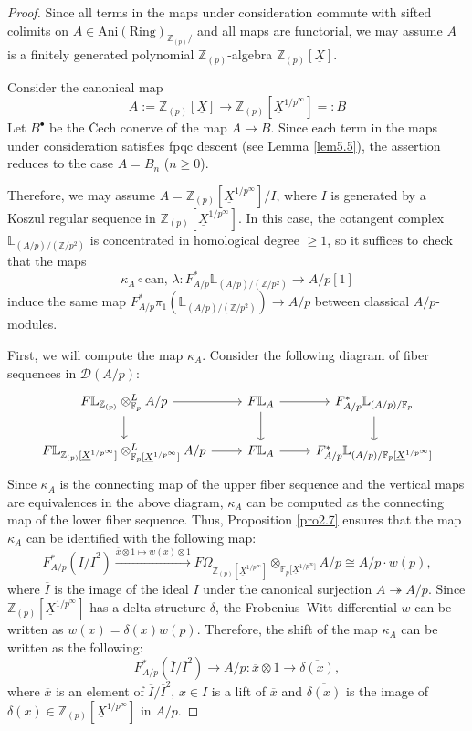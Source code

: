 \documentclass[11pt, a4paper]{amsart}
\theoremstyle{plain}
\theoremstyle{definition}
\begin{document}
\begin{proof}
    Since all terms in the maps under consideration commute with sifted colimits on $A\in \operatorname{Ani(Ring)}_{\mathbb Z_{(p)}/}$ and all maps are functorial, we may assume $A$ is a finitely generated polynomial $\mathbb Z_{(p)}$-algebra $\mathbb Z_{(p)}[\underline{X}]$.

    Consider the canonical map \[A:=\mathbb Z_{(p)}[\underline{X}]\to \mathbb Z_{(p)}[\underline{X}^{1/p^{\infty}}]=:B\]
    Let $B^{\bullet}$ be the \v{C}ech conerve of the map $A\to B$. Since each term in the maps under consideration satisfies fpqc descent (see Lemma \ref{lem5.5}), the assertion reduces to the case $A=B_n$ ($n\ge0$). 

    Therefore, we may assume $A=\mathbb Z_{(p)}[\underline{X}^{1/p^{\infty}}]/I$, where $I$ is generated by a Koszul regular sequence in $\mathbb Z_{(p)}[\underline{X}^{1/p^{\infty}}]$. In this case, the cotangent complex $\mathbb L_{(A/p)/(\mathbb Z/p^2)}$ is concentrated in homological degree $\ge 1$, so it suffices to check that the maps \[\kappa_A\circ \mathrm{can},\,\lambda:F_{A/p}^*\mathbb L_{(A/p)/(\mathbb Z/p^2)}\to A/p[1]\] induce the same map $F_{A/p}^*\pi_1(\mathbb L_{(A/p)/(\mathbb Z/p^2)})\to A/p$ between classical $A/p$-modules.

    First, we will compute the map $\kappa_A$. Consider the following diagram of fiber sequences in $\mathcal D(A/p)$:\[
\begin{tikzcd}
F\mathbb L_{\mathbb Z_{(p)}}\otimes^L_{\mathbb F_p}A/p \arrow[r, ] \arrow[d, ] 
    & F\mathbb L_A \arrow[r, ] \arrow[d, ] 
    & F_{A/p}^*\mathbb L_{(A/p)/\mathbb F_p}  \arrow[d, ]\\
F\mathbb L_{\mathbb Z_{(p)}[\underline{X}^{1/p^{\infty}}]}\otimes^L_{\mathbb F_p[\underline{X}^{1/p^{\infty}}]}A/p \arrow[r, ] 
    & F\mathbb L_A \arrow[r, ] 
    &  F_{A/p}^*\mathbb L_{(A/p)/\mathbb F_p[\underline{X}^{1/p^{\infty}}]} 
\end{tikzcd}
\]
Since $\kappa_A$ is the connecting map of the upper fiber sequence and the vertical maps are equivalences in the above diagram, $\kappa_A$ can be computed as the connecting map of the lower fiber sequence. Thus, Proposition \ref{pro2.7} ensures that the map $\kappa_A$ can be identified with the following map:\[F_{A/p}^*(\overline{I}/\overline{I}^2)\xrightarrow[]{\overline {x}\otimes 1\mapsto w(x)\otimes 1}F\Omega_{\mathbb Z_{(p)}[\underline{X}^{1/p^{\infty}}]}\otimes _{\mathbb F_p[\underline{X}^{1/p^{\infty}]}}A/p\cong A/p\cdot w(p),\] where $\overline I$ is the image of the ideal $I$ under the canonical surjection $A\twoheadrightarrow A/p$. Since $\mathbb Z_{(p)}[\underline{X}^{1/p^{\infty}}]$ has a delta-structure $\delta$, the Frobenius--Witt differential $w$ can be written as $w(x)=\delta(x)w(p)$. Therefore, the shift of the map $\kappa_A$ can be written as the following:
\[F_{A/p}^*(\overline I/\overline I^2)\to A/p:\overline x\otimes 1\to \overline {\delta(x)},\] where $\overline x$ is an element of $\overline{I}/\overline I^2$, $x\in I$ is a lift of $\overline x$ and $\overline{\delta(x)}$ is the image of $\delta(x)\in \mathbb Z_{(p)}[\underline{X}^{1/p^{\infty}}]$ in $A/p$.


\end{proof}
\end{document}
